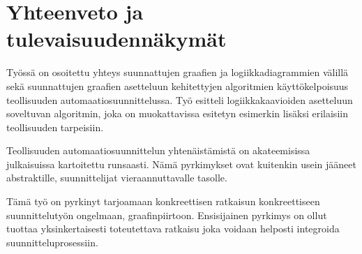 \documentclass[finnish,12pt]{article}
\begin{document}
	\section{Yhteenveto ja tulevaisuudennäkymät}

Työssä on osoitettu yhteys suunnattujen graafien ja logiikkadiagrammien välillä sekä suunnattujen graafien asetteluun kehitettyjen algoritmien käyttökelpoisuus teollisuuden automaatiosuunnittelussa.
Työ esitteli logiikkakaavioiden asetteluun soveltuvan algoritmin, joka on muokattavissa esitetyn esimerkin lisäksi erilaisiin teollisuuden tarpeisiin.

Teollisuuden automaatiosuunnittelun yhtenäistämistä on akateemisissa julkaisuissa kartoitettu runsaasti.
Nämä pyrkimykset ovat kuitenkin usein jääneet abstraktille, suunnittelijat vieraannuttavalle tasolle.

Tämä työ on pyrkinyt tarjoamaan konkreettisen ratkaisun konkreettiseen suunnittelutyön ongelmaan, graafinpiirtoon.
Ensisijainen pyrkimys on ollut tuottaa yksinkertaisesti toteutettava ratkaisu joka voidaan helposti integroida suunnitteluprosessiin.

\clearpage
{}


\end{document}
